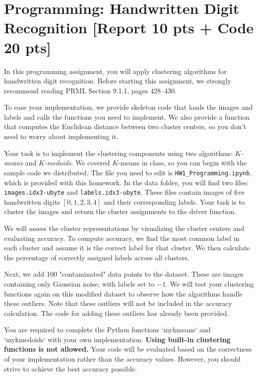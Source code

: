 \documentclass[11pt,epic]{article}
\begin{document}
\section{Programming: Handwritten Digit Recognition [Report 10 pts + Code 20 pts]}
In this programming assignment, you will apply clustering algorithms for handwritten digit recognition. Before starting this assignment, we strongly recommend reading PRML Section 9.1.1, pages 428–430.

To ease your implementation, we provide skeleton code that loads the images and labels and calls the functions you need to implement. We also provide a function that computes the Euclidean distance between two cluster centers, so you don't need to worry about implementing it.

Your task is to implement the clustering components using two algorithms: \emph{\(K\)-means} and \emph{\(K\)-medoids}. We covered \(K\)-means in class, so you can begin with the sample code we distributed. The file you need to edit is \texttt{HW1\_Programming.ipynb}, which is provided with this homework. In the data folder, you will find two files: \texttt{images.idx3-ubyte} and \texttt{labels.idx3-ubyte}. These files contain images of five handwritten digits \([0, 1, 2, 3, 4]\) and their corresponding labels. Your task is to cluster the images and return the cluster assignments to the driver function.

We will assess the cluster representations by visualizing the cluster centers and evaluating accuracy. To compute accuracy, we find the most common label in each cluster and assume it is the correct label for that cluster. We then calculate the percentage of correctly assigned labels across all clusters.

Next, we add 100 "contaminated" data points to the dataset. These are images containing only Gaussian noise, with labels set to \(-1\). We will test your clustering functions again on this modified dataset to observe how the algorithms handle these outliers. Note that these outliers will not be included in the accuracy calculation. The code for adding these outliers has already been provided.

You are required to complete the Python functions `mykmeans` and `mykmedoids` with your own implementation. \textbf{Using built-in clustering functions is not allowed.} Your code will be evaluated based on the correctness of your implementation rather than the accuracy values. However, you should strive to achieve the best accuracy possible.
\end{document}
